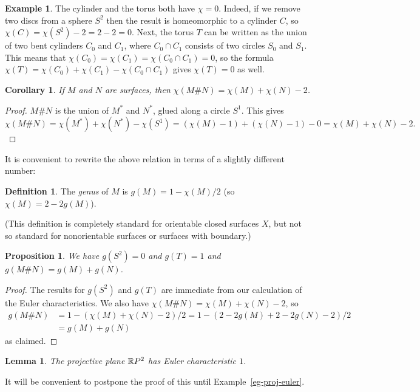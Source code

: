 \documentclass[reqno]{amsart}
\newtheorem{lemma}[theorem]{Lemma}
\newtheorem{proposition}[theorem]{Proposition}
\newtheorem{corollary}[theorem]{Corollary}
\theoremstyle{definition}
\newtheorem{definition}[theorem]{Definition}
\newtheorem{example}[theorem]{Example}
\begin{document}
\begin{example}\label{eg-cyl-euler}
 The cylinder and the torus both have $\chi=0$.  Indeed, if we remove
 two discs from a sphere $S^2$ then the result is homeomorphic to a
 cylinder $C$, so $\chi(C)=\chi(S^2)-2=2-2=0$.  Next, the torus $T$
 can be written as the union of two bent cylinders $C_0$ and $C_1$,
 where $C_0\cap C_1$ consists of two circles $S_0$ and $S_1$.  This
 means that $\chi(C_0)=\chi(C_1)=\chi(C_0\cap C_1)=0$, so the formula
 $\chi(T)=\chi(C_0)+\chi(C_1)-\chi(C_0\cap C_1)$ gives $\chi(T)=0$ as
 well.    
\end{example}

\begin{corollary}
 If $M$ and $N$ are surfaces, then $\chi(M\# N)=\chi(M)+\chi(N)-2$.
\end{corollary}
\begin{proof}
 $M\# N$ is the union of $M^*$ and $N^*$, glued along a circle $S^1$.
 This gives 
 \[ \chi(M\# N) = \chi(M^*) + \chi(N^*) - \chi(S^1) 
      = (\chi(M)-1) + (\chi(N)-1) - 0 
      = \chi(M) + \chi(N) - 2. 
 \]
\end{proof}

It is convenient to rewrite the above relation in terms of a slightly
different number:
\begin{definition}
 The \emph{genus} of $M$ is $g(M)=1-\chi(M)/2$ (so $\chi(M)=2-2g(M)$).
\end{definition}
(This definition is completely standard for orientable closed surfaces
$X$, but not so standard for nonorientable surfaces or surfaces with
boundary.)

\begin{proposition}
 We have $g(S^2)=0$ and $g(T)=1$ and $g(M\# N)=g(M)+g(N)$.
\end{proposition}
\begin{proof}
 The results for $g(S^2)$ and $g(T)$ are immediate from our
 calculation of the Euler characteristics.  We also have
 $\chi(M\# N)=\chi(M)+\chi(N)-2$, so 
 \begin{align*}
  g(M\# N) &= 1 - (\chi(M)+\chi(N)-2)/2 
            = 1 - (2-2g(M)+2-2g(N)-2)/2 \\
           &= g(M) + g(N)
 \end{align*}
 as claimed.
\end{proof}

\begin{lemma}\label{lem-proj-euler}
 The projective plane $\mathbb{R} P^2$ has Euler characteristic $1$.
\end{lemma}
It will be convenient to postpone the proof of this until
Example~\ref{eg-proj-euler}. 
\end{document}
